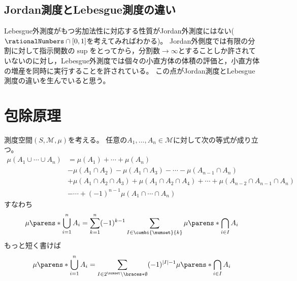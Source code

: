         \subsection{Jordan測度とLebesgue測度の違い}
            Lebesgue外測度がもつ劣加法性に対応する性質がJordan外測度にはない($\rationalNumbers\cap[0,1]$を考えてみればわかる)。
            Jordan外側度では有限の分割に対して指示関数の$\sup$をとってから，分割数$\to\infty$とすることしか許されていないのに対し，Lebesgue外測度では個々の小直方体の体積の評価と，小直方体の増産を同時に実行することを許されている。
            この点がJordan測度とLebesgue測度の違いを生んでいると思う。
    \section{包除原理}
        \begin{shadebox}
            測度空間$(S,\mathcal{M},\mu)$を考える。
            任意の$A_1,\dotsc,A_n\in\mathcal{M}$に対して次の等式が成り立つ。
            \begin{align*}
                \mu(A_1\cup\dotsb\cup A_n) &= \mu(A_1)+\dotsb +\mu(A_n) \\
                &- \mu(A_1\cap A_2) - \mu(A_1\cap A_3) - \dotsb - \mu(A_{n-1}\cap A_n) \\
                &+ \mu(A_1\cap A_2\cap A_3) + \mu(A_1\cap A_2\cap A_4) + \dotsb + \mu(A_{n-2}\cap A_{n-1}\cap A_n) \\
                &- \dotsb +(-1)^{n-1}\mu(A_1\cap\dotsb\cap A_n)
            \end{align*}
            すなわち
            \begin{equation}
                \mu\parens*{\bigcup_{i=1}^n A_i} = \sum_{k=1}^n (-1)^{k-1}\sum_{I\in\combi{\numset}{k}} \mu\parens*{\bigcap_{i\in I}A_i}
            \end{equation}
            もっと短く書けば
            \[ \mu\parens*{\bigcup_{i=1}^n A_i} = \sum_{I\in 2^\numset\setminus\braces*{\emptyset}} (-1)^{|I|-1}\mu\parens*{\bigcap_{i\in I}A_i} \]
        \end{shadebox}
